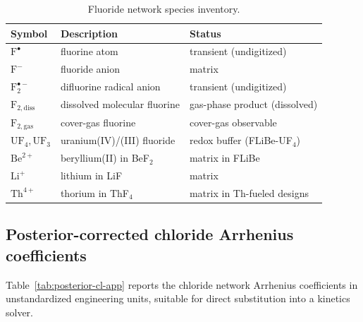 \documentclass[11pt]{article}
\theoremstyle{plain}
\theoremstyle{definition}
\theoremstyle{remark}
\begin{document}
\begin{table}[h!]
\centering
\caption{Fluoride network species inventory.}
\label{tab:species-f}
\small
\begin{tabular}{lll}
\toprule
Symbol & Description & Status \\
\midrule
$\mathrm{F}^{\bullet}$ & fluorine atom & transient (undigitized) \\
$\mathrm{F}^-$ & fluoride anion & matrix \\
$\mathrm{F}_2^{\bullet-}$ & difluorine radical anion & transient (undigitized) \\
$\mathrm{F}_{2,\mathrm{diss}}$ & dissolved molecular fluorine & gas-phase product (dissolved) \\
$\mathrm{F}_{2,\mathrm{gas}}$ & cover-gas fluorine & cover-gas observable \\
$\mathrm{UF}_4, \mathrm{UF}_3$ & uranium(IV)/(III) fluoride & redox buffer (FLiBe-UF$_4$) \\
$\mathrm{Be}^{2+}$ & beryllium(II) in BeF$_2$ & matrix in FLiBe \\
$\mathrm{Li}^+$ & lithium in LiF & matrix \\
$\mathrm{Th}^{4+}$ & thorium in ThF$_4$ & matrix in Th-fueled designs \\
\bottomrule
\end{tabular}
\end{table}

\subsection{Posterior-corrected chloride Arrhenius coefficients}

Table~\ref{tab:posterior-cl-app} reports the chloride network Arrhenius
coefficients in unstandardized engineering units, suitable for direct
substitution into a kinetics solver.
\end{document}
